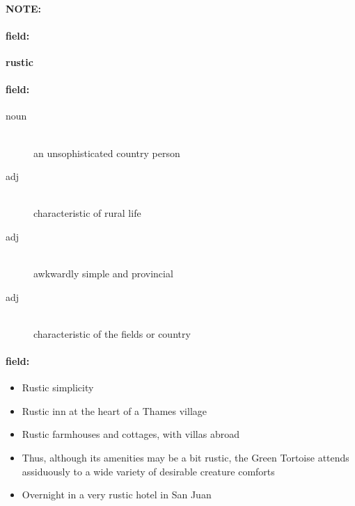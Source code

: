 \documentclass[12pt]{article}
\newenvironment{note}{\paragraph{NOTE:}}{}
\newenvironment{field}{\paragraph{field:}}{}
\begin{document}
\begin{note}
\begin{field}
\textbf{\large rustic}
\end{field}


\begin{field}
\begin{description}
\item[noun] \hfill \\ 
an unsophisticated country person

\item[adj] \hfill \\ 
characteristic of rural life

\item[adj] \hfill \\ 
awkwardly simple and provincial

\item[adj] \hfill \\ 
characteristic of the fields or country

\end{description}
\end{field}

\begin{field}
\begin{itemize}
\item Rustic simplicity
\item Rustic inn at the heart of a Thames village
\item Rustic farmhouses and cottages, with villas abroad
\item Thus, although its amenities may be a bit rustic, the Green Tortoise attends assiduously to a wide variety of desirable creature comforts
\item Overnight in a very rustic hotel in San Juan
\end{itemize}
\end{field}
\end{note}
\end{document}
